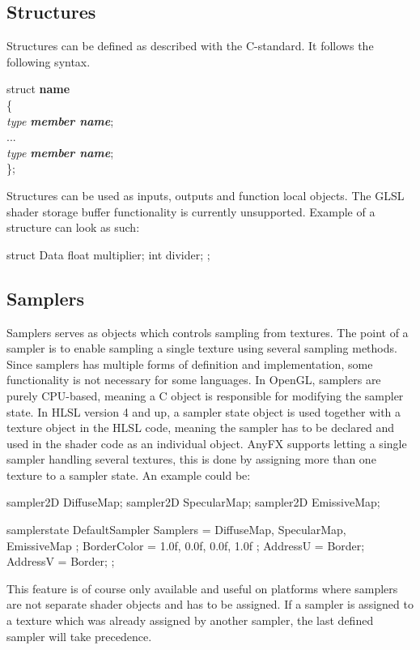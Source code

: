 \documentclass{article}
\newcommand{\SyntaxBox}[1]
{	
	\begin{center}
	\colorbox{orange!60}
	{
		\begin{minipage}{\linewidth}
		\hfill
		\begin{tabbing}
		#1
		\end{tabbing}
		\end{minipage}
	}
	\end{center}
}
\begin{document}
\subsection{Structures}
Structures can be defined as described with the C-standard. It follows the following syntax.

\SyntaxBox
{
	struct \textbf{name} \\
	\{ \= \\
		\> \textit{type \textbf{member name}}; \\
		\>... \\
		\> \textit{type \textbf{member name}}; \\
	\};
}

Structures can be used as inputs, outputs and function local objects. The GLSL shader storage buffer functionality is currently unsupported. Example of a structure can look as such:

\begin{CodeBox}
struct Data
{
	float multiplier;
	int divider;
};
\end{CodeBox}

\subsection{Samplers}
Samplers serves as objects which controls sampling from textures. The point of a sampler is to enable sampling a single texture using several sampling methods. Since samplers has multiple forms of definition and implementation, some functionality is not necessary for some languages. In OpenGL, samplers are purely CPU-based, meaning a C object is responsible for modifying the sampler state. In HLSL version 4 and up, a sampler state object is used together with a texture object in the HLSL code, meaning the sampler has to be declared and used in the shader code as an individual object. AnyFX supports letting a single sampler handling several textures, this is done by assigning more than one texture to a sampler state. An example could be:

\begin{CodeBox}
sampler2D DiffuseMap;
sampler2D SpecularMap;
sampler2D EmissiveMap;

samplerstate DefaultSampler
{
	Samplers = { DiffuseMap, SpecularMap, EmissiveMap }; 
	BorderColor = { 1.0f, 0.0f, 0.0f, 1.0f };
	AddressU = Border;
	AddressV = Border;
};
\end{CodeBox}

This feature is of course only available and useful on platforms where samplers are not separate shader objects and has to be assigned. If a sampler is assigned to a texture which was already assigned by another sampler, the last defined sampler will take precedence. 
\end{document}
